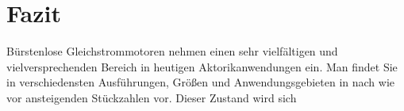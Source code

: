 \section{Fazit}

Bürstenlose Gleichstrommotoren nehmen einen sehr vielfältigen und vielversprechenden Bereich in heutigen Aktorikanwendungen ein. Man findet Sie in verschiedensten Ausführungen, Größen und Anwendungsgebieten in nach wie vor ansteigenden Stückzahlen vor. Dieser Zustand wird sich 

